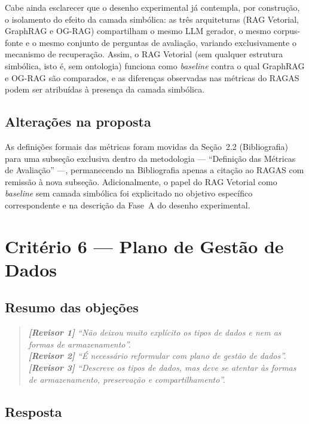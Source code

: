 \documentclass{article}
\newenvironment{parecer}
{\begin{quote}\itshape\color{gray!70!black}\small}
	{\end{quote}}
\newcommand{\revisor}[1]{\textbf{[Revisor #1]}}
\begin{document}
	Cabe ainda esclarecer que o desenho experimental já contempla, por construção,
	o isolamento do efeito da camada simbólica: as três arquiteturas (RAG Vetorial,
	GraphRAG e OG-RAG) compartilham o mesmo LLM gerador, o mesmo corpus-fonte e o
	mesmo conjunto de perguntas de avaliação, variando exclusivamente o mecanismo
	de recuperação. Assim, o RAG Vetorial (sem qualquer estrutura simbólica, isto
	é, sem ontologia) funciona como \textit{baseline} contra o qual GraphRAG e OG-RAG
	são comparados, e as diferenças observadas nas métricas do RAGAS podem ser
	atribuídas à presença da camada simbólica.
	
	\subsection{Alterações na proposta}
	
	As definições formais das métricas foram movidas da Seção~2.2 (Bibliografia)
	para uma subseção exclusiva dentro da metodologia --- ``Definição das Métricas
	de Avaliação'' ---, permanecendo na Bibliografia apenas a citação ao RAGAS com
	remissão à nova subseção. Adicionalmente, o papel do RAG Vetorial como
	\textit{baseline} sem camada simbólica foi explicitado no objetivo específico
	correspondente e na descrição da Fase~A do desenho experimental.
	
	\section{Critério 6 --- Plano de Gestão de Dados}
	
	\subsection{Resumo das objeções}
	\begin{parecer}
		\revisor{1} ``Não deixou muito explícito os tipos de dados e nem as
		formas de armazenamento''.\\
		\revisor{2} ``É necessário reformular com plano de gestão de dados''.\\
		\revisor{3} ``Descreve os tipos de dados, mas deve se atentar às formas de
		armazenamento, preservação e compartilhamento''.
	\end{parecer}
	
	\subsection{Resposta}
	
\end{document}
